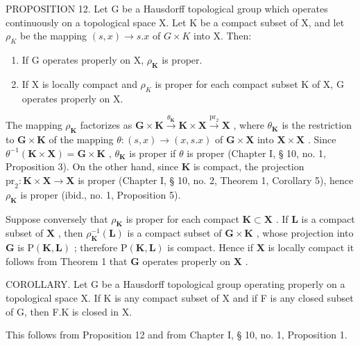 PROPOSITION 12. Let G be a Hausdorff topological group which operates continuously on a topological space X. Let K be a compact subset of X, and let \(\rho_{K}\) be the mapping \((s, x) \to s.x\) of \(G \times K\) into X. Then:

\begin{enumerate}
\def\labelenumi{\alph{enumi})}
\item
  If G operates properly on X, \(\rho_{\mathbf{K}}\) is proper.
\item
  If X is locally compact and \(\rho_{K}\) is proper for each compact subset K of X, G operates properly on X.
\end{enumerate}

The mapping \(\rho_{\mathbf{K}}\) factorizes as \(\mathbf{G} \times \mathbf{K} \xrightarrow{\theta_{\mathbf{K}}} \mathbf{K} \times \mathbf{X} \xrightarrow{\mathrm{pr}_2} \mathbf{X}\) , where \(\theta_{\mathbf{K}}\) is the restriction to \(\mathbf{G} \times \mathbf{K}\) of the mapping \(\theta: (s, x) \to (x, s.x)\) of \(\mathbf{G} \times \mathbf{X}\) into \(\mathbf{X} \times \mathbf{X}\) . Since \(\theta^{-1}(\mathbf{K} \times \mathbf{X}) = \mathbf{G} \times \mathbf{K}\) , \(\theta_{\mathbf{K}}\) is proper if \(\theta\) is proper (Chapter I, § 10, no. 1, Proposition 3). On the other hand, since \(\mathbf{K}\) is compact, the projection \(\mathrm{pr}_2: \mathbf{K} \times \mathbf{X} \to \mathbf{X}\) is proper (Chapter I, § 10, no. 2, Theorem 1, Corollary 5), hence \(\rho_{\mathbf{K}}\) is proper (ibid., no. 1, Proposition 5).

Suppose conversely that \(\rho_{\mathbf{K}}\) is proper for each compact \(\mathbf{K} \subset \mathbf{X}\) . If \(\mathbf{L}\) is a compact subset of \(\mathbf{X}\) , then \(\rho_{\mathbf{K}}^{-1}(\mathbf{L})\) is a compact subset of \(\mathbf{G} \times \mathbf{K}\) , whose projection into \(\mathbf{G}\) is \(\mathrm{P}(\mathbf{K}, \mathbf{L})\) ; therefore \(\mathrm{P}(\mathbf{K}, \mathbf{L})\) is compact. Hence if \(\mathbf{X}\) is locally compact it follows from Theorem 1 that \(\mathbf{G}\) operates properly on \(\mathbf{X}\) .

COROLLARY. Let G be a Hausdorff topological group operating properly on a topological space X. If K is any compact subset of X and if F is any closed subset of G, then F.K is closed in X.

This follows from Proposition 12 and from Chapter I, § 10, no. 1, Proposition 1.

